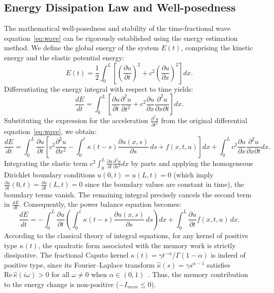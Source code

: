 \documentclass[a4paper,fleqn]{cas-sc}
\begin{document}
\begin{appendix}
\section{Energy Dissipation Law and Well-posedness}\label{app:existence}
The mathematical well-posedness and stability of the time-fractional wave equation~\eqref{eq:wave} can be rigorously established using the energy estimation method. We define the global energy of the system $E(t)$, comprising the kinetic energy and the elastic potential energy:
\begin{equation}
E(t) = \frac{1}{2} \int_0^L \left[ \left(\frac{\partial u}{\partial t}\right)^2 + c^2 \left(\frac{\partial u}{\partial x}\right)^2 \right] dx.
\end{equation}
Differentiating the energy integral with respect to time yields:
\begin{equation}
\frac{dE}{dt} = \int_0^L \left[ \frac{\partial u}{\partial t} \frac{\partial^2 u}{\partial t^2} + c^2 \frac{\partial u}{\partial x} \frac{\partial^2 u}{\partial x \partial t} \right] dx.
\end{equation}
Substituting the expression for the acceleration $\frac{\partial^2 u}{\partial t^2}$ from the original differential equation~\eqref{eq:wave}, we obtain:
\begin{equation}
\frac{dE}{dt} = \int_0^L \frac{\partial u}{\partial t} \left[ c^2 \frac{\partial^2 u}{\partial x^2} - \int_0^t \kappa(t-s) \frac{\partial u(x,s)}{\partial s} \, ds + f(x,t,u) \right] dx + \int_0^L c^2 \frac{\partial u}{\partial x} \frac{\partial^2 u}{\partial x \partial t} dx.
\end{equation}
Integrating the elastic term $c^2 \int_0^L \frac{\partial u}{\partial t} \frac{\partial^2 u}{\partial x^2} dx$ by parts and applying the homogeneous Dirichlet boundary conditions $u(0,t)=u(L,t)=0$ (which imply $\frac{\partial u}{\partial t}(0,t) = \frac{\partial u}{\partial t}(L,t) = 0$ since the boundary values are constant in time), the boundary terms vanish. The remaining integral precisely cancels the second term in $\frac{dE}{dt}$. Consequently, the power balance equation becomes:
\begin{equation}
\frac{dE}{dt} = - \int_0^L \frac{\partial u}{\partial t} \left( \int_0^t \kappa(t-s) \frac{\partial u(x,s)}{\partial s} \, ds \right) dx + \int_0^L \frac{\partial u}{\partial t} f(x,t,u) \, dx.
\end{equation}
According to the classical theory of integral equations, for any kernel of positive type $\kappa(t)$, the quadratic form associated with the memory work is strictly dissipative. The fractional Caputo kernel $\kappa(t) = \gamma t^{-\alpha}/\Gamma(1-\alpha)$ is indeed of positive type, since its Fourier--Laplace transform $\hat{\kappa}(s) = \gamma s^{\alpha-1}$ satisfies $\mathrm{Re}\,\hat{\kappa}(i\omega) > 0$ for all $\omega \ne 0$ when $\alpha \in (0,1)$~\cite{mclean2010}. Thus, the memory contribution to the energy change is non-positive ($-I_{mem} \le 0$).


\end{appendix}
\end{document}

